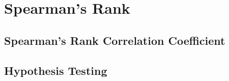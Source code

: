 \documentclass[../maths.tex]{subfiles}
\begin{document}
\chapter{Spearman's Rank}
\section{Spearman's Rank Correlation Coefficient}
\section{Hypothesis Testing}
\end{document}
